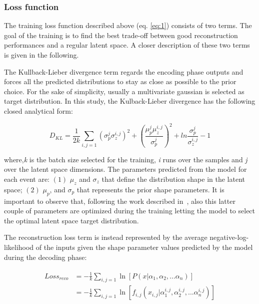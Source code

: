 \subsubsection{Loss function}
\label{subsubsec:loss}
The training loss function described above (eq. \ref{eq:1}) consists of two terms. The goal of the training is to find the best trade-off between good reconstruction performances and a regular latent space. A closer description of these two terms is given in the following.

The Kullback-Lieber divergence term regards the encoding phase outputs and forces all the predicted distributions to stay as close as possible to the prior choice. For the sake of simplicity, usually a multivariate gaussian is selected as target distribution. In this study, the Kulback-Lieber divergence has the following closed analytical form:

\begin{equation}\label{eq:2}
    D_{KL}=  \frac{1}{2k}  \sum_{i,j=1} \left( \sigma_{p}^{j}\sigma_{z}^{i,j} \right)^{2} +
\left( \frac{\mu_{p}^{j}\mu_{z}^{i,j}}{\sigma_{p}^{j}} \right)^{2} +
ln{\frac{\sigma_{p}^{j}}{\sigma_{z}^{i,j}}} -1 
\end{equation}

where,\textit{k} is the batch size selected for the training, \textit{i} runs over the samples and \textit{j} over the latent space dimensions. The parameters predicted from the model for each event are: $(1)$ $\mu_{z}$  and $\sigma_{z}$ that define the distribution shape in the latent space; $(2)$ $\mu_{p}$, and $\sigma_{p}$ that represents the prior shape parameters. It is important to observe that, following the work described in~\cite{vae:Cerri_2019}, also this latter couple of parameters are optimized during the training letting the model to select the optimal latent space target distribution.

The reconstruction loss term is instead represented by the average negative-log-likelihood of the inputs given the shape parameter values predicted by the model during the decoding phase:

\begin{align}\label{eq:3}
\begin{split}
    Loss_{reco}&=  -\frac{1}{k} \sum_{i,j=1} \ln \left[
    P\left(x| \alpha_{1}, \alpha_{2},...\alpha_{n}\right)
    \right]   \\
    &=  -\frac{1}{k} \sum_{i,j=1} \ln \left[
    f_{i,j}\left(x_{i,j}| \alpha_{1}^{i,j}, \alpha_{2}^{i,j},...\alpha_{n}^{i,j}\right)
    \right]   
\end{split}
\end{align}

